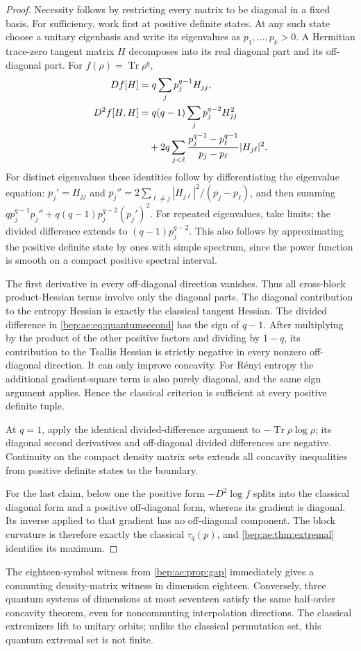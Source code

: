 \documentclass[11pt]{article}
\numberwithin{equation}{section}
\theoremstyle{definition}
\theoremstyle{remark}
\newcommand{\tr}{\operatorname{Tr}}
\begin{document}
\begin{proof}
Necessity follows by restricting every matrix to be diagonal in a fixed
basis. For sufficiency, work first at positive definite states. At any
such state choose a unitary eigenbasis and write its eigenvalues as
$p_1,\ldots,p_k>0$. A Hermitian trace-zero tangent matrix $H$ decomposes
into its real diagonal part and its off-diagonal part. For
$f(\rho)=\tr\rho^q$,
\begin{align}
 Df[H]&=q\sum_jp_j^{q-1}H_{jj},\label{bep:ae:eq:quantumfirst}\\
 D^2f[H,H]
 &=q(q-1)\sum_jp_j^{q-2}H_{jj}^2\notag\\
 &\quad+2q\sum_{j<\ell}
     \frac{p_j^{q-1}-p_\ell^{q-1}}{p_j-p_\ell}
     |H_{j\ell}|^2.\label{bep:ae:eq:quantumsecond}
\end{align}
For distinct eigenvalues these identities follow by differentiating the
eigenvalue equation: $p_j'=H_{jj}$ and
$p_j''=2\sum_{\ell\ne j}|H_{j\ell}|^2/(p_j-p_\ell)$, and then summing
$q p_j^{q-1}p_j''+q(q-1)p_j^{q-2}(p_j')^2$.
For repeated eigenvalues, take limits; the divided difference extends
to $(q-1)p_j^{q-2}$. This also follows by approximating the positive
definite state by ones with simple spectrum, since the power function
is smooth on a compact positive spectral interval.

The first derivative in every off-diagonal direction vanishes. Thus
all cross-block product-Hessian terms involve only the diagonal parts.
The diagonal contribution to the entropy Hessian is exactly the
classical tangent Hessian. The divided difference in
\eqref{bep:ae:eq:quantumsecond} has the sign of $q-1$. After multiplying by
the product of the other positive factors and dividing by $1-q$, its
contribution to the Tsallis Hessian is strictly negative in every
nonzero off-diagonal direction. It can only improve concavity.
For R\'enyi entropy the additional gradient-square term is also purely
diagonal, and the same sign argument applies. Hence the classical
criterion is sufficient at every positive definite tuple.

At $q=1$, apply the identical divided-difference argument to
$-\tr\rho\log\rho$; its diagonal second derivatives and off-diagonal
divided differences are negative. Continuity on the compact density
matrix sets extends all concavity inequalities from positive definite
states to the boundary.

For the last claim, below one the positive form $-D^2\log f$ splits
into the classical diagonal form and a positive off-diagonal form,
whereas its gradient is diagonal. Its inverse applied to that gradient
has no off-diagonal component. The block curvature is therefore exactly
the classical $\tau_q(p)$, and \cref{bep:ae:thm:extremal} identifies its maximum.
\end{proof}
The eighteen-symbol witness from \cref{bep:ae:prop:gap} immediately gives a
commuting density-matrix witness in dimension eighteen. Conversely,
three quantum systems of dimensions at most seventeen satisfy the same
half-order concavity theorem, even for noncommuting interpolation
directions. The classical extremizers lift to unitary orbits; unlike
the classical permutation set, this quantum extremal set is not finite.
\end{document}
